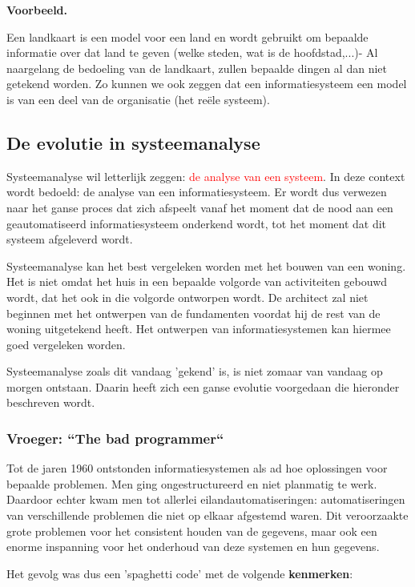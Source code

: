 \textbf{Voorbeeld.}

Een landkaart is een model voor een land en wordt gebruikt om bepaalde informatie over dat land te geven (welke steden, wat is de hoofdstad,...)- Al naargelang de bedoeling van de landkaart, zullen bepaalde dingen al dan niet getekend worden.
Zo kunnen we ook zeggen dat een informatiesysteem een model is van een deel van de organisatie (het reële systeem).

\subsection{De evolutie in systeemanalyse}

Systeemanalyse wil letterlijk zeggen: \textcolor{red}{de analyse van een systeem}. In deze context wordt bedoeld: de analyse van een informatiesysteem. Er wordt dus verwezen naar het ganse proces dat zich afspeelt vanaf het moment dat de nood aan een geautomatiseerd informatiesysteem onderkend wordt, tot het moment dat dit systeem afgeleverd wordt.

Systeemanalyse kan het best vergeleken worden met het bouwen van een woning. Het is niet omdat het huis in een bepaalde volgorde van activiteiten gebouwd wordt, dat het ook in die volgorde ontworpen wordt. De architect zal niet beginnen met het ontwerpen van de fundamenten voordat hij de rest van de woning uitgetekend heeft. Het ontwerpen van informatiesystemen kan hiermee goed vergeleken worden.

Systeemanalyse zoals dit vandaag 'gekend' is, is niet zomaar van vandaag op morgen ontstaan. Daarin heeft zich een ganse evolutie voorgedaan die hieronder beschreven wordt.

\subsubsection{Vroeger: \textquotedblleft The bad programmer\textquotedblleft }

Tot de jaren 1960 ontstonden informatiesystemen als ad hoe oplossingen voor bepaalde problemen. Men ging ongestructureerd en niet planmatig te werk. Daardoor echter kwam men tot allerlei eilandautomatiseringen: automatiseringen van verschillende problemen die niet op elkaar afgestemd waren. Dit veroorzaakte grote problemen voor het consistent houden van de gegevens, maar ook een enorme inspanning voor het onderhoud van deze systemen en hun gegevens.

Het gevolg was dus een 'spaghetti code’ met de volgende \textbf{kenmerken}:

